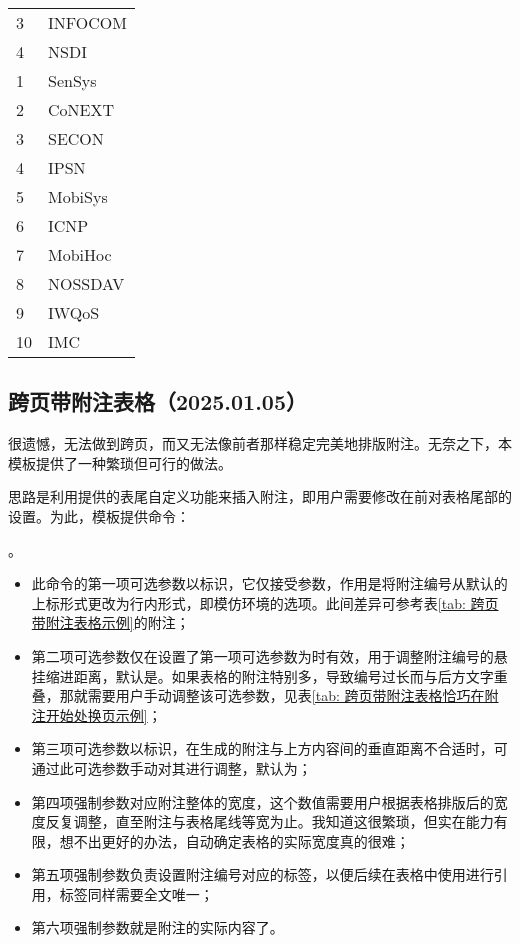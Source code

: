 \documentclass[print, doctor, vlined]{DissertUESTC}
\begin{document}
\begin{longtable}{p{2em} p{4.5em}}
		3 & INFOCOM \\
		4 & NSDI \\
		1 & SenSys \\
		2 & CoNEXT \\
		3 & SECON \\
		4 & IPSN \\
		5 & MobiSys \\
		6 & ICNP \\
		7 & MobiHoc \\
		8 & NOSSDAV \\
		9 & IWQoS \\
		10 & IMC \\
	\end{longtable}

	\clearpage
	\subsection{跨页带附注表格（2025.01.05）}

	很遗憾，无法做到跨页，而又无法像前者那样稳定完美地排版附注。无奈之下，本模板提供了一种繁琐但可行的做法。

	思路是利用提供的表尾自定义功能来插入附注，即用户需要修改在前对表格尾部的设置。为此，模板提供命令：
	
	。

	\begin{itemize}
		\item 此命令的第一项可选参数以\shad{()}标识，它仅接受参数，作用是将附注编号从默认的上标形式更改为行内形式，即模仿环境的选项。此间差异可参考表\ref{tab: 跨页带附注表格示例}的附注；
		\item 第二项可选参数仅在设置了第一项可选参数为时有效，用于调整附注编号的悬挂缩进距离，默认是\shad{1em}。如果表格的附注特别多，导致编号过长而与后方文字重叠，那就需要用户手动调整该可选参数，见表\ref{tab: 跨页带附注表格恰巧在附注开始处换页示例}；
		\item 第三项可选参数以\shad{[]}标识，在生成的附注与上方内容间的垂直距离不合适时，可通过此可选参数手动对其进行调整，默认为\shad{0bp}；
		\item 第四项强制参数对应附注整体的宽度，这个数值需要用户根据表格排版后的宽度反复调整，直至附注与表格尾线等宽为止。我知道这很繁琐，但实在能力有限，想不出更好的办法，自动确定表格的实际宽度真的很难；
		\item 第五项强制参数负责设置附注编号对应的标签，以便后续在表格中使用进行引用，标签同样需要全文唯一；
		\item 第六项强制参数就是附注的实际内容了。
	\end{itemize}
\end{document}
